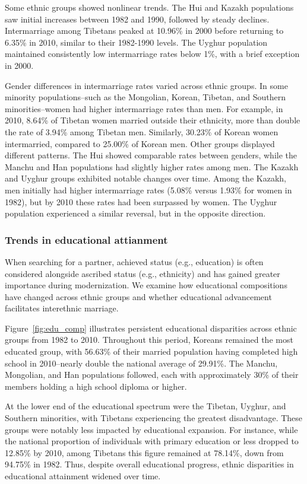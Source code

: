Some ethnic groups showed nonlinear trends.
The Hui and Kazakh populations saw initial increases between 1982 and 1990,
followed by steady declines.
Intermarriage among Tibetans peaked at 10.96\% in 2000 before returning to
6.35\% in 2010, similar to their 1982-1990 levels.
The Uyghur population maintained consistently low intermarriage rates below 1\%,
with a brief exception in 2000.

Gender differences in intermarriage rates varied across ethnic groups.
In some minority populations--such as the Mongolian, Korean, Tibetan, and
Southern minorities--women had higher intermarriage rates than men.
For example, in 2010, 8.64\% of Tibetan women married outside their ethnicity,
more than double the rate of 3.94\% among Tibetan men.
Similarly, 30.23\% of Korean women intermarried, compared to 25.00\% of Korean
men.
Other groups displayed different patterns.
The Hui showed comparable rates between genders, while the Manchu and Han
populations had slightly higher rates among men.
The Kazakh and Uyghur groups exhibited notable changes over time.
Among the Kazakh, men initially had higher intermarriage rates (5.08\% versus
1.93\% for women in 1982), but by 2010 these rates had been surpassed by women.
The Uyghur population experienced a similar reversal, but in the opposite direction.

\subsubsection{Trends in educational attianment}

When searching for a partner, achieved status (e.g., education) is often
considered alongside ascribed status (e.g., ethnicity) and has gained greater
importance during modernization.
We examine how educational compositions have changed across ethnic groups and
whether educational advancement facilitates interethnic marriage.



Figure~\ref{fig:edu_comp} illustrates persistent educational disparities across
ethnic groups from 1982 to 2010.
Throughout this period, Koreans remained the most educated group, with 56.63\%
of their married population having completed high school in 2010--nearly double
the national average of 29.91\%.
The Manchu, Mongolian, and Han populations followed, each with approximately
30\% of their members holding a high school diploma or higher.

At the lower end of the educational spectrum were the Tibetan, Uyghur, and
Southern minorities, with Tibetans experiencing the greatest disadvantage.
These groups were notably less impacted by educational expansion.
For instance, while the national proportion of individuals with primary
education or less dropped to 12.85\% by 2010, among Tibetans this figure
remained at 78.14\%, down from 94.75\% in 1982.
Thus, despite overall educational progress, ethnic disparities in educational
attainment widened over time.

